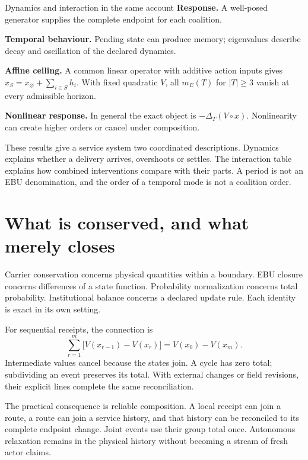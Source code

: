 \begin{lawbox}{Dynamics and interaction in the same account}
\textbf{Response.} A well-posed generator supplies the complete endpoint for each coalition.

\textbf{Temporal behaviour.} Pending state can produce memory; eigenvalues describe decay and oscillation of the declared dynamics.

\textbf{Affine ceiling.} A common linear operator with additive action inputs gives $x_S=x_\varnothing+\sum_{i\in S}h_i$. With fixed quadratic $V$, all $m_E(T)$ for $|T|\geq3$ vanish at every admissible horizon.

\textbf{Nonlinear response.} In general the exact object is $-\Delta_T(V\circ x)$. Nonlinearity can create higher orders or cancel under composition.
\end{lawbox}

These results give a service system two coordinated descriptions. Dynamics explains whether a delivery arrives, overshoots or settles. The interaction table explains how combined interventions compare with their parts. A period is not an EBU denomination, and the order of a temporal mode is not a coalition order.

\section{What is conserved, and what merely closes}
Carrier conservation concerns physical quantities within a boundary. EBU closure concerns differences of a state function. Probability normalization concerns total probability. Institutional balance concerns a declared update rule. Each identity is exact in its own setting.

For sequential receipts, the connection is
\begin{equation}
 \sum_{r=1}^{m}\bigl[V(x_{r-1})-V(x_r)\bigr]=V(x_0)-V(x_m).
\end{equation}
Intermediate values cancel because the states join. A cycle has zero total; subdividing an event preserves its total. With external changes or field revisions, their explicit lines complete the same reconciliation.

The practical consequence is reliable composition. A local receipt can join a route, a route can join a service history, and that history can be reconciled to its complete endpoint change. Joint events use their group total once. Autonomous relaxation remains in the physical history without becoming a stream of fresh actor claims.


